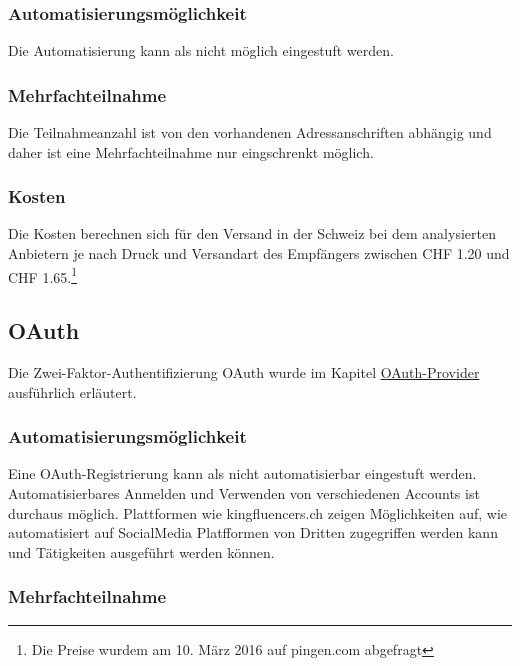 \subsubsection{Automatisierungsmöglichkeit}\label{automatisierungsmuxf6glichkeit-5}

Die Automatisierung kann als nicht möglich eingestuft werden.

\subsubsection{Mehrfachteilnahme}\label{mehrfachteilnahme-4}

Die Teilnahmeanzahl ist von den vorhandenen Adressanschriften abhängig
und daher ist eine Mehrfachteilnahme nur eingschrenkt möglich.

\subsubsection{Kosten}\label{kosten-6}

Die Kosten berechnen sich für den Versand in der Schweiz bei dem
analysierten Anbietern je nach Druck und Versandart des Empfängers
zwischen CHF 1.20 und CHF 1.65.\footnote{Die Preise wurdem am 10. März
  2016 auf pingen.com abgefragt}

\hypertarget{oauth-1}{\subsection{OAuth}\label{oauth-1}}

Die Zwei-Faktor-Authentifizierung OAuth wurde im Kapitel
\protect\hyperlink{oauth-provider}{OAuth-Provider} ausführlich
erläutert.

\subsubsection{Automatisierungsmöglichkeit}\label{automatisierungsmuxf6glichkeit-6}

Eine OAuth-Registrierung kann als nicht automatisierbar eingestuft
werden. Automatisierbares Anmelden und Verwenden von verschiedenen
Accounts ist durchaus möglich. Plattformen wie kingfluencers.ch zeigen
Möglichkeiten auf, wie automatisiert auf SocialMedia Platfformen von
Dritten zugegriffen werden kann und Tätigkeiten ausgeführt werden
können.

\subsubsection{Mehrfachteilnahme}\label{mehrfachteilnahme-5}

